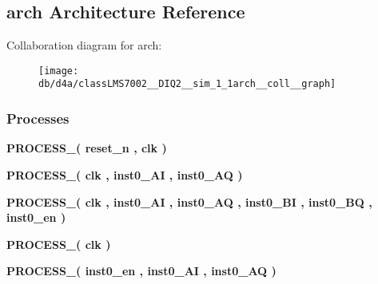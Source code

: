\subsection{arch Architecture Reference}
\label{classLMS7002__DIQ2__sim_1_1arch}


Collaboration diagram for arch\+:\nopagebreak
\begin{figure}[H]
\begin{center}
\leavevmode
\texttt{[image: db/d4a/classLMS7002\_\_DIQ2\_\_sim\_1\_1arch\_\_coll\_\_graph]}
\end{center}
\end{figure}
\subsubsection*{Processes}
 \begin{DoxyCompactItemize}
\item 
{\bf P\+R\+O\+C\+E\+S\+S\+\_}{\bfseries  ( {\bfseries {\bfseries {\bf reset\+\_\+n}} \textcolor{vhdlchar}{ }} , {\bfseries {\bfseries {\bf clk}} \textcolor{vhdlchar}{ }} )}
\item 
{\bf P\+R\+O\+C\+E\+S\+S\+\_}{\bfseries  ( {\bfseries {\bfseries {\bf clk}} \textcolor{vhdlchar}{ }} , {\bfseries {\bfseries {\bf inst0\+\_\+\+AI}} \textcolor{vhdlchar}{ }} , {\bfseries {\bfseries {\bf inst0\+\_\+\+AQ}} \textcolor{vhdlchar}{ }} )}
\item 
{\bf P\+R\+O\+C\+E\+S\+S\+\_}{\bfseries  ( {\bfseries {\bfseries {\bf clk}} \textcolor{vhdlchar}{ }} , {\bfseries {\bfseries {\bf inst0\+\_\+\+AI}} \textcolor{vhdlchar}{ }} , {\bfseries {\bfseries {\bf inst0\+\_\+\+AQ}} \textcolor{vhdlchar}{ }} , {\bfseries {\bfseries {\bf inst0\+\_\+\+BI}} \textcolor{vhdlchar}{ }} , {\bfseries {\bfseries {\bf inst0\+\_\+\+BQ}} \textcolor{vhdlchar}{ }} , {\bfseries {\bfseries {\bf inst0\+\_\+en}} \textcolor{vhdlchar}{ }} )}
\item 
{\bf P\+R\+O\+C\+E\+S\+S\+\_}{\bfseries  ( {\bfseries {\bfseries {\bf clk}} \textcolor{vhdlchar}{ }} )}
\item 
{\bf P\+R\+O\+C\+E\+S\+S\+\_}{\bfseries  ( {\bfseries {\bfseries {\bf inst0\+\_\+en}} \textcolor{vhdlchar}{ }} , {\bfseries {\bfseries {\bf inst0\+\_\+\+AI}} \textcolor{vhdlchar}{ }} , {\bfseries {\bfseries {\bf inst0\+\_\+\+AQ}} \textcolor{vhdlchar}{ }} )}
\end{DoxyCompactItemize}
